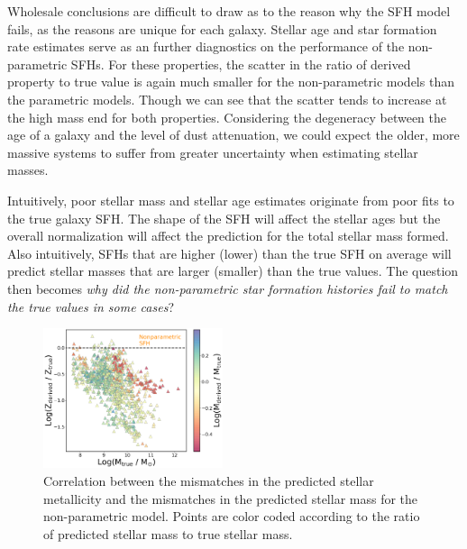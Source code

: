 \documentclass[twocolumn]{aastex62}
\begin{document}
Wholesale conclusions are difficult to draw as to the reason why the SFH model fails, as the reasons are unique for each galaxy. Stellar age and star formation rate estimates serve as an further diagnostics on the performance of the non-parametric SFHs. For these properties, the scatter in the ratio of derived property to true value is again much smaller for the non-parametric models than the parametric models. Though we can see that the scatter tends to increase at the high mass end for both properties. Considering the degeneracy between the age of a galaxy and the level of dust attenuation, we could expect the older, more massive systems to suffer from greater uncertainty when estimating stellar masses. 

Intuitively, poor stellar mass and stellar age estimates originate from poor fits to the true galaxy SFH. The shape of the SFH will affect the stellar ages but the overall normalization will affect the prediction for the total stellar mass formed. Also intuitively, SFHs that are higher (lower) than the true SFH on average will predict stellar masses that are larger (smaller) than the true values. The question then becomes \textit{why did the non-parametric star formation histories fail to match the true values in some cases}? 

\begin{figure}[h!]

\centering
\includegraphics[width=0.47\textwidth]{Zratio_dir.png}

\caption{Correlation between the mismatches in the predicted stellar metallicity and the mismatches in the predicted stellar mass for the non-parametric model. Points are color coded according to the ratio of predicted stellar mass to true stellar mass.}
\label{fig:zratio}
\end{figure}
\end{document}
